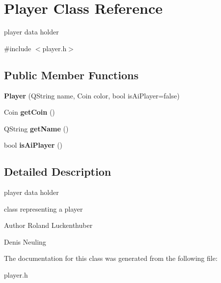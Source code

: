 \hypertarget{classPlayer}{\section{\-Player \-Class \-Reference}
\label{classPlayer}
}


player data holder  




{\ttfamily \#include $<$player.\-h$>$}

\subsection*{\-Public \-Member \-Functions}
\begin{DoxyCompactItemize}
\item 
\hypertarget{classPlayer_a877063d8943797400d52fe2735d521c3}{{\bfseries \-Player} (\-Q\-String name, \-Coin color, bool is\-Ai\-Player=false)}\label{classPlayer_a877063d8943797400d52fe2735d521c3}

\item 
\hypertarget{classPlayer_a60bab4053f47b075a4228b5237394711}{\-Coin {\bfseries get\-Coin} ()}\label{classPlayer_a60bab4053f47b075a4228b5237394711}

\item 
\hypertarget{classPlayer_ade0334ac0e87ac1c5e09ce78f2cafd83}{\-Q\-String {\bfseries get\-Name} ()}\label{classPlayer_ade0334ac0e87ac1c5e09ce78f2cafd83}

\item 
\hypertarget{classPlayer_a0f345ac8c69275c700ed776ddac094c3}{bool {\bfseries is\-Ai\-Player} ()}\label{classPlayer_a0f345ac8c69275c700ed776ddac094c3}

\end{DoxyCompactItemize}


\subsection{\-Detailed \-Description}
player data holder 

class representing a player

\begin{DoxyAuthor}{\-Author}
\-Roland \-Luckenthuber 

\-Denis \-Neuling 
\end{DoxyAuthor}


\-The documentation for this class was generated from the following file\-:\begin{DoxyCompactItemize}
\item 
player.\-h\end{DoxyCompactItemize}
